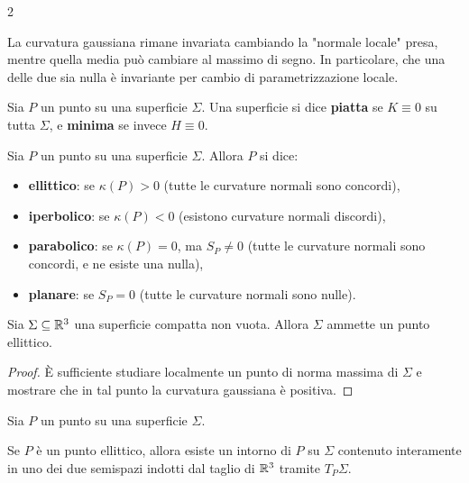 \begin{multicols*}{2}
    \begin{remark}
        La curvatura gaussiana rimane invariata cambiando la "normale locale" presa, mentre
        quella media può cambiare al massimo di segno. In particolare, che
        una delle due sia nulla è invariante per cambio di parametrizzazione locale.
    \end{remark}

    \begin{definition}
        Sia $P$ un punto su una superficie $\Sigma$. Una superficie
        si dice \textbf{piatta} se $K \equiv 0$ su tutta $\Sigma$, e
        \textbf{minima} se invece $H \equiv 0$.
    \end{definition}

    \begin{definition}
        Sia $P$ un punto su una superficie $\Sigma$. Allora $P$ si dice:
        \begin{itemize}
            \item \textbf{ellittico}: se $\kappa(P) > 0$ (tutte le curvature normali sono concordi),
            \item \textbf{iperbolico}: se $\kappa(P) < 0$ (esistono curvature normali discordi),
            \item \textbf{parabolico}: se $\kappa(P) = 0$, ma $S_P \neq 0$ (tutte le curvature normali sono concordi, e ne esiste una nulla),
            \item \textbf{planare}: se $S_P = 0$ (tutte le curvature normali sono nulle).
        \end{itemize}
    \end{definition}


    \begin{proposition}
        Sia $\Sigma \subseteq \mathbb{R}^3$ una superficie compatta non vuota. Allora
        $\Sigma$ ammette un punto ellittico.
    \end{proposition}

    \begin{proof}
        È sufficiente studiare localmente un punto di norma massima di $\Sigma$ e
        mostrare che in tal punto la curvatura gaussiana è positiva.
    \end{proof}

    \begin{proposition}
        Sia $P$ un punto su una superficie $\Sigma$. \smallskip

        Se $P$ è un punto ellittico, allora esiste un intorno di $P$ su
        $\Sigma$ contenuto interamente in uno dei due semispazi indotti
        dal taglio di $\mathbb{R}^3$ tramite $T_P \Sigma$. \smallskip


\end{proposition}
\end{multicols*}
